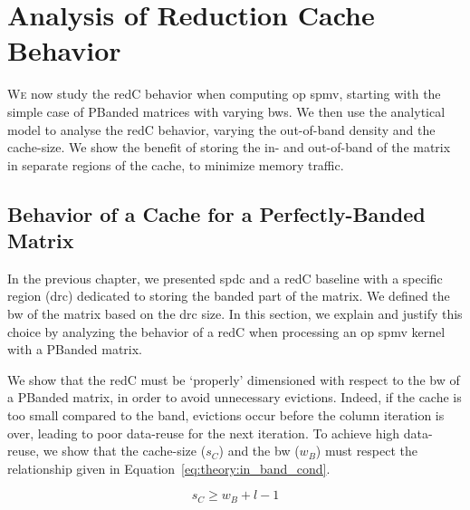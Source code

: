 
\section{Analysis of Reduction Cache Behavior}
\label{sec:theory:analysis}

\lettrine{W}{e} now study the \gls{redC} behavior when computing \acrshort{op} \acrshort{spmv}, starting with the simple case of \gls{PBanded} matrices with varying \glspl{bw}.
We then use the analytical model to analyse the \gls{redC} behavior, varying the out-of-\gls{band} density and the cache-size.
We show the benefit of storing the in- and out-of-\gls{band} of the matrix in separate regions of the cache, to minimize memory traffic.

\subsection{Behavior of a Cache for a Perfectly-Banded Matrix}
\label{sec:theory:perfectband_vs_cache}

In the previous chapter, we presented \acrlong{spdc} and a \gls{redC} baseline with a specific region (\acrshort{drc}) dedicated to storing the \gls{banded} part of the matrix.
We defined the \gls{bw} of the matrix based on the \acrshort{drc} size.
In this section, we explain and justify this choice by analyzing the behavior of a \gls{redC} when processing an \acrshort{op} \acrshort{spmv} kernel with a \gls{PBanded} matrix.

We show that the \gls{redC} must be `properly' dimensioned with respect to the \gls{bw} of a \gls{PBanded} matrix, in order to avoid unnecessary \glspl{eviction}.
Indeed, if the cache is too small compared to the \gls{band}, \glspl{eviction} occur before the column iteration is over, leading to poor data-reuse for the next iteration.
To achieve high data-reuse, we show that the cache-size ($s_C$) and the \gls{bw} ($w_B$) must respect the relationship given in Equation~\ref{eq:theory:in_band_cond}.

\begin{equation}
    s_C \geqslant w_B + l - 1
    \label{eq:theory:in_band_cond}
\end{equation}

